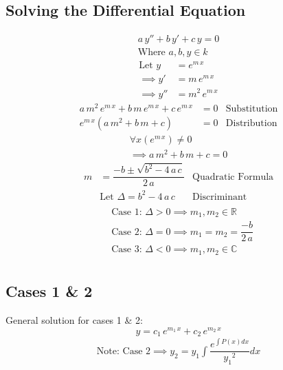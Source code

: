 \documentclass{article}
\begin{document}
	\subsection{Solving the Differential Equation}
		\begin{gather*}
			a\,y''+b\,y'+c\,y=0\\
			\text{Where } a,b,y\in k
		\end{gather*}
		\begin{align*}
			\text{Let }y&=e^{m\,x}\\
			\implies y'&=m\,e^{m\,x}\\
			\implies y''&=m^2\,e^{m\,x}
		\end{align*}
		\begin{align*}
			a\,m^2\,e^{m\,x}+b\,m\,e^{m\,x}+c\,e^{m\,x}&=0 &\text{Substitution}\\
			e^{m\,x}(a\,m^2+b\,m+c)&=0 &\text{Distribution}
		\end{align*}
		\begin{gather*}
			\forall x(e^{m\,x})\neq 0\\
			\implies a\,m^2+b\,m+c=0
		\end{gather*}
		\begin{align*}
			m&=\dfrac{-b\pm\sqrt{b^2-4\,a\,c}}{2\,a} &\text{Quadratic Formula}\\
			&\text{Let }\Delta=b^2-4\,a\,c &\text{Discriminant}\\
		\end{align*}
		\begin{align*}
			&\text{Case 1: }\Delta>0\implies m_1,m_2\in\mathbb{R}\\
			&\text{Case 2: }\Delta=0\implies m_1=m_2=\dfrac{-b}{2\,a}\\
			&\text{Case 3: }\Delta<0\implies m_1,m_2\in\mathbb{C}\\
		\end{align*}
	\subsection{Cases 1 \& 2}
		General solution for cases 1 \& 2:
		\begin{equation*}
			y=c_1\,e^{m_1\,x}+c_2\,e^{m_2\,x}
		\end{equation*}
		\begin{gather*}
			\text{Note: Case 2}\implies y_2=y_1\int{\dfrac{e^{\int{P(x)dx}}}{{y_1}^2}dx}
		\end{gather*}
\end{document}
